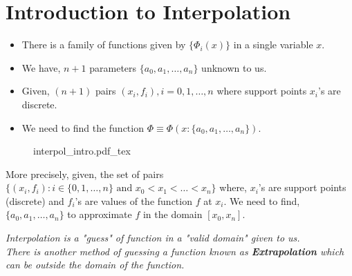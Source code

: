 \section{Introduction to Interpolation}
\begin{itemize}
	\item There is a family of functions given by $ \{\Phi_i(x)\} $ in a single variable $ x $.
	\item We have, $ n+1 $ parameters $ \{a_0,a_1,\ldots,a_n\} $ unknown to us.
	\item Given, $ (n+1) $ pairs $ (x_i,f_i), i=0,1,\ldots,n $  where support points $ x_i $'s are discrete.
	\item We need to find the function $ \Phi \equiv \Phi(x: \{a_0,a_1,\ldots,a_n\}) $.
\end{itemize}

\begin{figure}[H]
	\centering
	\def\svgwidth{0.8\textwidth}
	{interpol_intro.pdf_tex}
	\caption{}
	\label{fig1:mar4}
\end{figure}

More precisely, given, the set of pairs $\{(x_i,f_i): i \in \{0,1,\ldots,n\} \text{ and } x_0 < x_1 < \ldots < x_n \}$ where, $x_i$'s are support points (discrete) and $f_i$'s are values of the function $f$ at $x_i$. We need to find, $\{a_0,a_1,\ldots,a_n\}$ to approximate $f$ in the domain $[x_0,x_n]$.

\begin{rmk}
	\textit{Interpolation is a "guess" of function in a "valid domain" given to us. \\
		There is another method of guessing a function known as \textbf{Extrapolation} which can be outside the domain of the function.}
\end{rmk}



